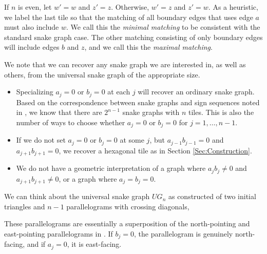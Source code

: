 \documentclass[11pt]{article}
\numberwithin{equation}{section}
\begin{document}
If $n$ is even, let $w' = w$ and $z' = z$. Otherwise, $w' = z$ and $z' = w$. As a heuristic, we label the last tile so that the matching of all boundary edges that uses edge $a$ must also include $w$. We call this the \emph{minimal matching} to be consistent with the standard snake graph case. The other matching consisting of only boundary edges will include edges $b$ and $z$, and we call this the \emph{maximal matching}.


We note that we can recover any snake graph we are interested in, as well as others, from the universal snake graph of the appropriate size.
\begin{itemize}\itemsep=0pt
\item Specializing $a_j = 0$ or $b_j = 0$ at each $j$ will recover an ordinary snake graph. Based on the correspondence between snake graphs and sign sequences noted in \cite{Canakci-Schiffler}, we know that there are $2^{n-1}$ snake graphs with $n$ tiles. This is also the number of ways to choose whether $a_j = 0$ or $b_j = 0$ for $j = 1, \ldots, n-1$.
\item If we do not set $a_j = 0$ or $b_j = 0$ at some $j$, but $a_{j-1}b_{j-1} = 0$ and $a_{j+1}b_{j+1} = 0$, we recover a hexagonal tile as in Section \ref{Sec:Construction}.
\item We do not have a geometric interpretation of a graph where $a_jb_j \neq 0$ and $a_{j+1}b_{j+1} \neq 0$, or a graph where $a_j = b_j = 0$.
\end{itemize}

\begin{Remark}
We can think about the universal snake graph $UG_n$ as constructed of two initial triangles and $n-1$ parallelograms with crossing diagonals,
\begin{center}
\end{center}

These parallelograms are essentially a superposition of the north-pointing and east-pointing parallelograms in \cite{MW}. If $b_j = 0$, the parallelogram is genuinely north-facing, and if $a_j = 0$, it is east-facing.
\end{Remark}
\end{document}
